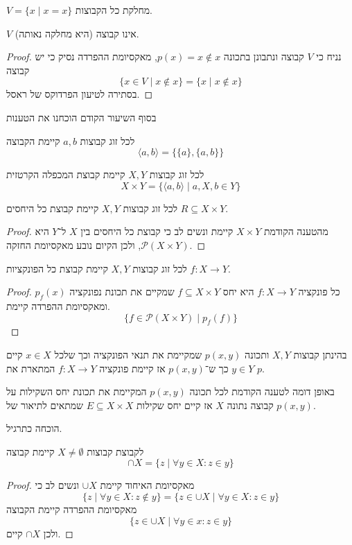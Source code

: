 \begin{notation}
	$V = \{ x \mid x = x \}$ מחלקת כל הקבוצות.
\end{notation}
\begin{proposition}
	$V$ אינו קבוצה (היא מחלקה נאותה).
\end{proposition}
\begin{proof}
	נניח כי $V$ קבוצה ונתבונן בתכונה $p(x) = x \notin x$, מאקסיומת ההפרדה נסיק כי יש קבוצה
	\[
		\{ x \in V \mid x \notin x \} = \{ x \mid x \notin x \}
	\]
	בסתירה לטיעון הפרדוקס של ראסל.
\end{proof}
בסוף השיעור הקודם הוכחנו את הטענות
\begin{proposition}
	לכל זוג קבוצות $a, b$ קיימת הקבוצה
	\[
		\langle a, b \rangle = \{ \{a\}, \{a, b\} \}
	\]
\end{proposition}
\begin{proposition}
	לכל זוג קבוצות $X, Y$ קיימת קבוצת המכפלה הקרטזית
	\[
		X \times Y = \{ \langle a, b \rangle \mid a, X, b \in Y \}
	\]
\end{proposition}
\begin{proposition}
	לכל זוג קבוצות $X, Y$ קיימת קבוצת כל היחסים $R \subseteq X \times Y$.
\end{proposition}
\begin{proof}
	מהטענה הקודמת $X \times Y$ קיימת ונשים לב כי קבוצת כל היחסים בין $X$ ל־$Y$ היא $\mathcal{P}(X \times Y)$, ולכן הקיום נובע מאקסיומת החזקה.
\end{proof}
\begin{proposition}
	לכל זוג קבוצות $X, Y$ קיימת קבוצת כל הפונקציות $f : X \to Y$.
\end{proposition}
\begin{proof}
	כל פונקציה $f : X \to Y$ היא יחס $f \subseteq X \times Y$ שמקיים את תכונת נפונקציה $p_f(x)$ ומאקסיומת ההפרדה קיימת.
	\[
		\{ f \in \mathcal{P}(X \times Y) \mid p_f(f) \}
	\]
\end{proof}
\begin{proposition}
	בהינתן קבוצות $X, Y$ ותכונה $p(x, y)$ שמקיימת את תנאי הפונקציה וכך שלכל $x \in X$ קיים $y \in Y$ כך ש־$p(x, y)$ אז קיימת פונקציה $f : X \to Y$ המתארת את  $p$.
\end{proposition}
\begin{proposition}
	באופן דומה לטענה הקודמת לכל תכונה $p(x, y)$ המקיימת את תכונת יחס השקילות על קבוצה נתונה $X$ אז קיים יחס שקילות $E \subseteq X \times X$ שמתאים לתיאור של $p(x, y)$.
\end{proposition}
הוכחה כתרגיל.
\begin{proposition}
	לקבוצת קבוצות $X \ne \emptyset$ קיימת קבוצה
	\[
		\cap X = \{ z \mid \forall y \in X : z \in y \}
	\]
\end{proposition}
\begin{proof}
	מאקסיומת האיחוד קיימת $\cup X$ ונשים לב כי
	\[
		\{ z \mid \forall y \in X : z \notin y \} = \{ z \in \cup X \mid \forall y \in X : z \in y \}
	\]
	מאקסיומת ההפרדה קיימת הקבוצה
	\[
		\{ z \in \cup X \mid \forall y \in x : z \in y \}
	\]
	ולכן $\cap X$ קיים.
\end{proof}

